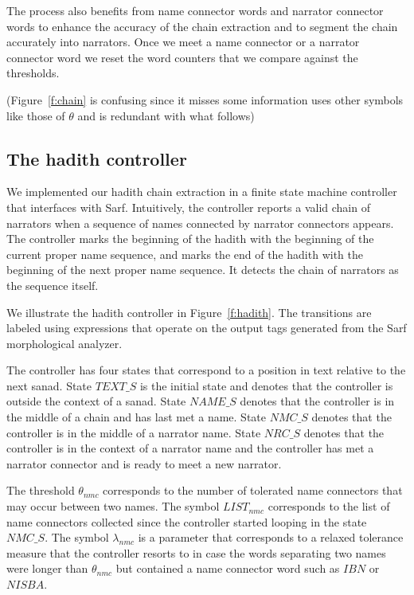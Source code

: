 \documentclass{llncs}
\begin{document}
The process also benefits from name connector 
words and narrator connector words to enhance the
accuracy of the chain extraction and to segment the 
chain accurately into narrators.
Once we meet a name connector or a narrator 
connector word we reset the word counters that we
compare against the thresholds. 

(Figure~\ref{f:chain} is confusing since it misses some information uses other symbols like 
those of $\theta$ and is redundant with what follows)


\subsection{The hadith controller}
\label{sec:controller}

We implemented our hadith chain extraction 
in a finite state machine
controller that interfaces with Sarf.
Intuitively, the controller reports a valid chain 
of narrators when a sequence of names
connected by narrator connectors appears. 
The controller marks the beginning of the hadith with 
the beginning of 
the current proper name sequence,
and marks the end of the hadith with the beginning of the 
next proper name sequence. 
It detects the chain of narrators as the sequence itself. 

We illustrate the hadith controller 
in Figure~\ref{f:hadith}. 
The transitions are labeled using expressions
that operate on the output tags 
generated from the Sarf morphological analyzer.

The controller has four states that correspond to 
a position in text relative to the next sanad. 
State $\mathit{TEXT\_S}$ is the initial state and denotes 
that the controller is outside the context of a sanad.
State $\mathit{NAME\_S}$ denotes that the controller is in
the middle of a chain and has last met a name. 
State $\mathit{NMC\_S}$ denotes that the controller is in
the middle of a narrator name.
State $\mathit{NRC\_S}$ denotes that the controller is 
in the context of a narrator name and the controller 
has met a narrator connector and is ready to meet 
a new narrator. 

The threshold $\theta_{\mathit{nmc}}$ 
corresponds to the number of tolerated name connectors 
that may occur between two names. %
The symbol $\mathit{LIST}_{\mathit{nmc}}$ corresponds to the list 
of name connectors collected since the controller
started looping in the state $\mathit{NMC\_S}$.
The symbol $\lambda_{\mathit{nmc}}$ is a parameter 
that corresponds to a relaxed tolerance measure that
the controller resorts to in case the words separating
two names were longer than $\theta_{\mathit{nmc}}$ but 
contained a name connector word such as $\mathit{IBN}$ 
or $\mathit{NISBA}$.
\end{document}
